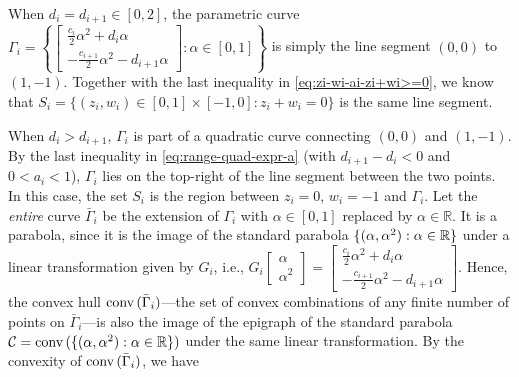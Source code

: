 	When $d_i = d_{i+1} \in [0,2]$, the parametric curve
	$\Gamma_i = \left\{ \begin{bmatrix}
		\frac{c_i}{2} \alpha^2 + d_i \alpha \\
		-\frac{c_{i+1}}{2} \alpha^2 - d_{i+1} \alpha
	\end{bmatrix}: \alpha \in [0,1] \right\}$
	is simply the line segment $(0,0)$ to $(1,-1)$. Together with the last inequality in \eqref{eq:zi-wi-ai-zi+wi>=0}, we know that
	$ S_i = \{ (z_i, w_i)\in [0,1]\times [-1, 0]: z_i + w_i = 0 \}$
	is the same line segment.

	When $d_i > d_{i+1}$, $\Gamma_i$ is part of a quadratic curve connecting $(0,0)$ and $(1,-1)$.
	By the last inequality in \eqref{eq:range-quad-expr-a} (with $d_{i+1} - d_i < 0$ and $0<a_i<1$), $\Gamma_i$ lies on the top-right of the line segment between the two points.
	In this case, the set $S_i$ is the region between $z_i = 0$, $w_i =-1$ and $\Gamma_i$. 
	Let the \emph{entire} curve $\bar{\Gamma}_i$ be the extension of $\Gamma_i$ with $\alpha\in [0,1]$ replaced by $\alpha \in \mathbb{R}$.	
	It is a parabola, since it is the image of the standard parabola $\{ (\alpha, \alpha^2): \alpha\in \mathbb{R} \}$ under a linear transformation given by $G_i$, i.e., $G_i \begin{bmatrix}
		\alpha \\ \alpha^2
	\end{bmatrix} = \begin{bmatrix}
		\frac{c_i}{2} \alpha^2 + d_i \alpha \\
		-\frac{c_{i+1}}{2}\alpha^2 - d_{i+1} \alpha
	\end{bmatrix}$.
	Hence, the convex hull $\textnormal{conv}\,(\bar{\Gamma}_i)$---the set of convex combinations of any finite number of points on $\bar{\Gamma}_i$---is also the image of the epigraph of the standard parabola $\mathcal{C}=\textnormal{conv}\,(\{ (\alpha, \alpha^2):\alpha\in \mathbb{R} \})$ under the same linear transformation. By the convexity of $\textnormal{conv}\,(\bar{\Gamma}_i)$, we have
